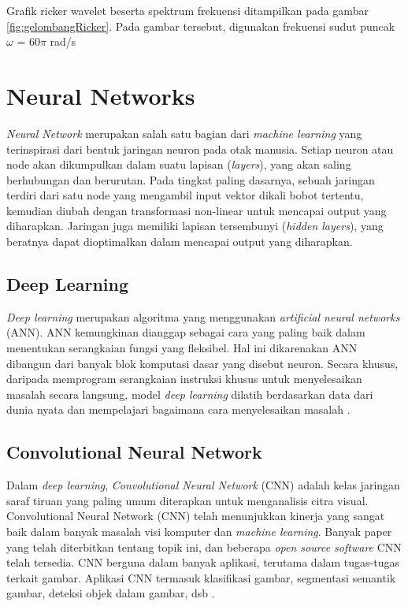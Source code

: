 Grafik ricker wavelet beserta spektrum frekuensi ditampilkan pada gambar \ref{fig:gelombangRicker}. 
Pada gambar tersebut, digunakan frekuensi sudut puncak $\omega$ = 60$\pi$ rad/s

\section{Neural Networks}
\label{sec:neuralNetworks}

\emph{Neural Network} merupakan salah satu bagian dari \emph{machine learning} yang terinspirasi dari bentuk jaringan neuron pada otak manusia. 
Setiap neuron atau node akan dikumpulkan dalam suatu lapisan (\emph{layers}), yang akan saling berhubungan dan berurutan. 
Pada tingkat paling dasarnya, sebuah jaringan terdiri dari satu node yang mengambil input vektor dikali bobot tertentu, kemudian diubah dengan transformasi non-linear untuk mencapai output yang diharapkan. 
Jaringan juga memiliki lapisan tersembunyi (\emph{hidden layers}), yang beratnya dapat dioptimalkan dalam mencapai output yang diharapkan.

\subsection{Deep Learning}
\label{subsesc:deeplearning}
\emph{Deep learning} merupakan algoritma yang menggunakan \emph{artificial neural networks} (ANN). 
ANN kemungkinan dianggap sebagai cara yang paling baik dalam menentukan serangkaian fungsi yang fleksibel. 
Hal ini dikarenakan ANN dibangun dari banyak blok komputasi dasar yang disebut neuron. 
Secara khusus, daripada memprogram serangkaian instruksi khusus untuk menyelesaikan masalah secara langsung, model \emph{deep learning} dilatih berdasarkan data dari dunia nyata dan mempelajari bagaimana cara menyelesaikan masalah \parencite{PDLT-2022}. 

\subsection{Convolutional Neural Network}
\label{subsec:convolutionalNeuralNetwork}

Dalam \emph{deep learning}, \emph{Convolutional Neural Network} (CNN) adalah kelas jaringan saraf tiruan yang paling umum diterapkan untuk menganalisis citra visual. 
Convolutional Neural Network (CNN) telah menunjukkan kinerja yang sangat baik dalam banyak masalah visi komputer dan \emph{machine learning}. 
Banyak paper yang telah diterbitkan tentang topik ini, dan beberapa \emph{open source software} CNN telah tersedia. 
CNN berguna dalam banyak aplikasi, terutama dalam tugas-tugas terkait gambar. 
Aplikasi CNN termasuk klasifikasi gambar, segmentasi semantik gambar, deteksi objek dalam gambar, dsb \parencite{introductionCNN}. 

